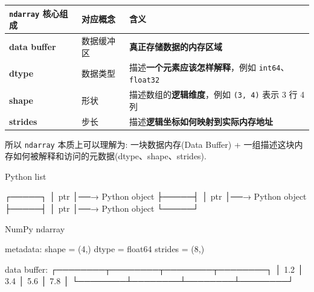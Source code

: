 \documentclass[11pt]{article}
\newenvironment{Shaded}{}{}
\newcommand{\NormalTok}[1]{{#1}}
\begin{document}
{\def\LTcaptype{none} %
\begin{longtable}[]{@{}
  >{\centering\arraybackslash}p{}
  >{\centering\arraybackslash}p{}
  >{\centering\arraybackslash}p{}@{}}
\toprule\noalign{}
\begin{minipage}[b]{\linewidth}\centering
\texttt{ndarray} 核心组成
\end{minipage} & \begin{minipage}[b]{\linewidth}\centering
对应概念
\end{minipage} & \begin{minipage}[b]{\linewidth}\centering
含义
\end{minipage} \\
\midrule\noalign{}
\endhead
\bottomrule\noalign{}
\endlastfoot
\textbf{data buffer} & 数据缓冲区 & \textbf{真正存储数据的内存区域} \\
\textbf{dtype} & 数据类型 & 描述\textbf{一个元素应该怎样解释}，例如
\texttt{int64}、\texttt{float32} \\
\textbf{shape} & 形状 & 描述数组的\textbf{逻辑维度}，例如
\texttt{(3,\ 4)} 表示 3 行 4 列 \\
\textbf{strides} & 步长 & 描述\textbf{逻辑坐标如何映射到实际内存地址} \\
\end{longtable}
}

所以 \texttt{ndarray} 本质上可以理解为: 一块数据内存(Data Buffer) +
一组描述这块内存如何被解释和访问的元数据(dtype、shape、strides).

\begin{Shaded}
\begin{Highlighting}[]
\NormalTok{Python list}

\NormalTok{┌─────┐}
\NormalTok{│ ptr │──→ Python object}
\NormalTok{├─────┤}
\NormalTok{│ ptr │──→ Python object}
\NormalTok{├─────┤}
\NormalTok{│ ptr │──→ Python object}
\NormalTok{└─────┘}

\NormalTok{NumPy ndarray}

\NormalTok{metadata:}
\NormalTok{shape   = (4,)}
\NormalTok{dtype   = float64}
\NormalTok{strides = (8,)}

\NormalTok{data buffer:}
\NormalTok{┌────────┬────────┬────────┬────────┐}
\NormalTok{│ 1.2    │ 3.4    │ 5.6    │ 7.8    │}
\NormalTok{└────────┴────────┴────────┴────────┘}
\end{Highlighting}
\end{Shaded}
\end{document}

